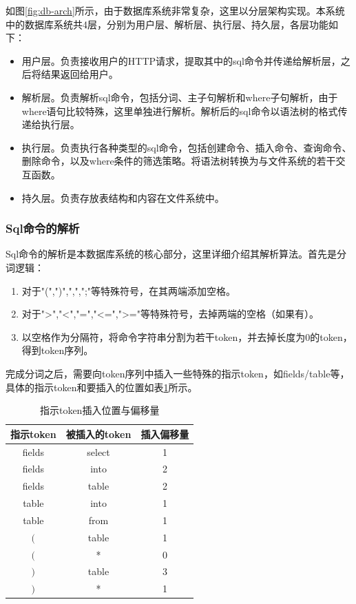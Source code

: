 如图\ref{fig:db-arch}所示，由于数据库系统非常复杂，这里以分层架构实现。本系统中的数据库系统共4层，分别为用户层、解析层、执行层、持久层，各层功能如下：
\begin{itemize}
    \item 用户层。负责接收用户的HTTP请求，提取其中的sql命令并传递给解析层，之后将结果返回给用户。
    \item 解析层。负责解析sql命令，包括分词、主子句解析和where子句解析，由于where语句比较特殊，这里单独进行解析。解析后的sql命令以语法树的格式传递给执行层。
    \item 执行层。负责执行各种类型的sql命令，包括创建命令、插入命令、查询命令、删除命令，以及where条件的筛选策略。将语法树转换为与文件系统的若干交互函数。
    \item 持久层。负责存放表结构和内容在文件系统中。
\end{itemize}

\subsubsection{Sql命令的解析}

Sql命令的解析是本数据库系统的核心部分，这里详细介绍其解析算法。首先是分词逻辑：
\begin{enumerate}
    \item 对于"(",")",",",";"等特殊符号，在其两端添加空格。
    \item 对于">","<","=","<=",">="等特殊符号，去掉两端的空格（如果有）。
    \item 以空格作为分隔符，将命令字符串分割为若干token，并去掉长度为0的token，得到token序列。
\end{enumerate}

完成分词之后，需要向token序列中插入一些特殊的指示token，如fields/table等，具体的指示token和要插入的位置如表\ref{tab:token}所示。

\begin{table}[H]
    \centering
    \caption{指示token插入位置与偏移量}
    \label{tab:token}
    {
    \begin{tabular}{|c|c|c|}
        \hline
        指示token & 被插入的token & 插入偏移量 \\
        \hline
        fields & select & 1 \\
        fields & into & 2 \\
        fields & table & 2 \\
        table & into & 1 \\
        table & from & 1 \\
        $($ & table & 1 \\
        $($ & * & 0 \\
        $)$ & table & 3 \\
        $)$ & * & 1 \\
        \hline
    \end{tabular}
    }
\end{table}

